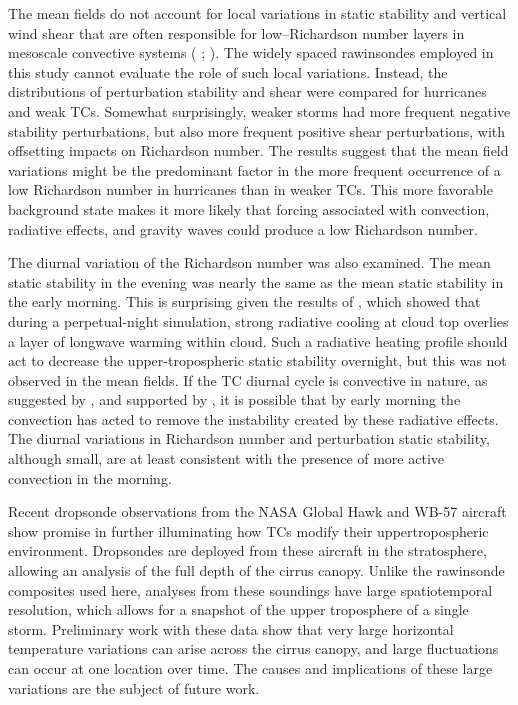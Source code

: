 The mean fields do not account for local variations in static stability and vertical wind shear that are often responsible for low--Richardson number layers in mesoscale convective systems (\citeauthor{Lenzetal2009} \citeyear{Lenzetal2009}; \citeauthor{Trieretal2010} \citeyear{Trieretal2010}).
The widely spaced rawinsondes employed in this study cannot evaluate the role of such local variations.
Instead, the distributions of perturbation stability and shear were compared for hurricanes and weak TCs.
Somewhat surprisingly, weaker storms had more frequent negative stability perturbations, but also more frequent positive shear perturbations, with offsetting impacts on Richardson number.
The results suggest that the mean field variations might be the predominant factor in the more frequent occurrence of a low Richardson number in hurricanes than in weaker TCs.
This more favorable background state makes it more likely that forcing associated with convection, radiative effects, and gravity waves could produce a low Richardson number.

The diurnal variation of the Richardson number was also examined. The mean static stability in the evening was nearly the same as the mean static stability in the early morning.
This is surprising given the results of \cite{MelhauserZhang2014}, which showed that during a perpetual-night simulation, strong radiative cooling at cloud top overlies a layer of longwave warming within cloud.
Such a radiative heating profile should act to decrease the upper-tropospheric static stability overnight, but this was not observed in the mean fields.
If the TC diurnal cycle is convective in nature, as suggested by \cite{Dunionetal2014}, and supported by \cite{BowmanFowler2015}, it is possible that by early morning the convection has acted to remove the instability created by these radiative effects.
The diurnal variations in Richardson number and perturbation static stability, although small, are at least consistent with the presence of more active convection in the morning.

Recent dropsonde observations from the NASA Global Hawk and WB-57 aircraft show promise in further illuminating how TCs modify their uppertropospheric environment.
Dropsondes are deployed from these aircraft in the stratosphere, allowing an analysis of the full depth of the cirrus canopy.
Unlike the rawinsonde composites used here, analyses from these soundings have large spatiotemporal resolution, which allows for a snapshot of the upper troposphere of a single storm.
Preliminary work with these data show that very large horizontal temperature variations can arise across the cirrus canopy, and large fluctuations can occur at one location over time.
The causes and implications of these large variations are the subject of future work.

